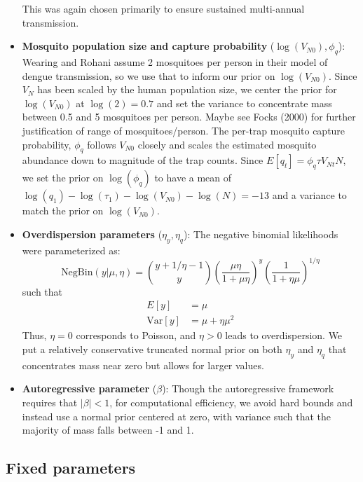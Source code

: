 \documentclass[10pt,letterpaper]{article}
\begin{document}
\begin{itemize}
This was again chosen primarily to ensure sustained multi-annual transmission.
\\
\item \textbf{Mosquito population size and capture probability} ($\log(V_{N0}), \phi_q$): Wearing and Rohani \cite{Wearing2006} assume 2 mosquitoes per person in their model of dengue transmission, so we use that to inform our prior on $\log(V_{N0})$.
Since $V_{N}$ has been scaled by the human population size, we center the prior for $\log(V_{N0})$ at $\log(2) = 0.7$ and set the variance to concentrate mass between 0.5 and 5 mosquitoes per person.
Maybe see Focks (2000) for further justification of range of mosquitoes/person.
The per-trap mosquito capture probability, $\phi_q$ follows $V_{N0}$ closely and scales the estimated mosquito abundance down to magnitude of the trap counts.
Since $ E[q_t] = \phi_q \tau V_{Nt} N$, we set the prior on $\log(\phi_q)$ to have a mean of $\log(q_1) - \log(\tau_1) - \log(V_{N0}) - \log(N) = -13$ and a variance to match the prior on $\log(V_{N0})$.
\\
\item \textbf{Overdispersion parameters} ($\eta_y, \eta_q$): The negative binomial likelihoods were parameterized as:
\begin{equation}
\text{NegBin}(y | \mu, \eta) = {y + 1/\eta -1 \choose y}\left(\frac{\mu\eta}{1 + \mu\eta}\right)^y\left(\frac{1}{1+\eta\mu}\right)^{1/\eta}
\end{equation}
such that
\begin{align}
E[y] & = \mu\\
\text{Var}[y] &= \mu + \eta\mu^2
\end{align}
Thus, $\eta = 0$ corresponds to Poisson, and $\eta > 0$ leads to overdispersion.
We put a relatively conservative truncated normal prior on both $\eta_y$ and $\eta_q$ that concentrates mass near zero but allows for larger values.
\\
\item \textbf{Autoregressive parameter} ($\beta$): Though the autoregressive framework requires that $|\beta| < 1$, for computational efficiency, we avoid hard bounds and instead use a normal prior centered at zero, with variance such that the majority of mass falls between -1 and 1.
\end{itemize}

\subsection*{Fixed parameters}
\end{document}
